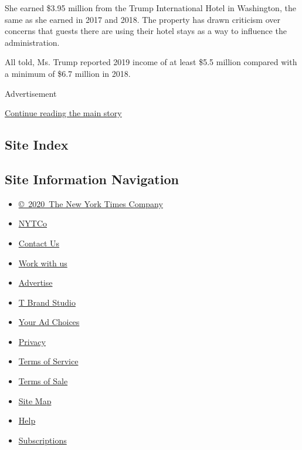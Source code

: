 She earned \$3.95 million from the Trump International Hotel in
Washington, the same as she earned in 2017 and 2018. The property has
drawn criticism over concerns that guests there are using their hotel
stays as a way to influence the administration.

All told, Ms. Trump reported 2019 income of at least \$5.5 million
compared with a minimum of \$6.7 million in 2018.

Advertisement

\protect\hyperlink{after-bottom}{Continue reading the main story}

\hypertarget{site-index}{%
\subsection{Site Index}\label{site-index}}

\hypertarget{site-information-navigation}{%
\subsection{Site Information
Navigation}\label{site-information-navigation}}

\begin{itemize}
\tightlist
\item
  \href{https://help.nytimes3xbfgragh.onion/hc/en-us/articles/115014792127-Copyright-notice}{©~2020~The
  New York Times Company}
\end{itemize}

\begin{itemize}
\tightlist
\item
  \href{https://www.nytco.com/}{NYTCo}
\item
  \href{https://help.nytimes3xbfgragh.onion/hc/en-us/articles/115015385887-Contact-Us}{Contact
  Us}
\item
  \href{https://www.nytco.com/careers/}{Work with us}
\item
  \href{https://nytmediakit.com/}{Advertise}
\item
  \href{http://www.tbrandstudio.com/}{T Brand Studio}
\item
  \href{https://www.nytimes3xbfgragh.onion/privacy/cookie-policy\#how-do-i-manage-trackers}{Your
  Ad Choices}
\item
  \href{https://www.nytimes3xbfgragh.onion/privacy}{Privacy}
\item
  \href{https://help.nytimes3xbfgragh.onion/hc/en-us/articles/115014893428-Terms-of-service}{Terms
  of Service}
\item
  \href{https://help.nytimes3xbfgragh.onion/hc/en-us/articles/115014893968-Terms-of-sale}{Terms
  of Sale}
\item
  \href{https://spiderbites.nytimes3xbfgragh.onion}{Site Map}
\item
  \href{https://help.nytimes3xbfgragh.onion/hc/en-us}{Help}
\item
  \href{https://www.nytimes3xbfgragh.onion/subscription?campaignId=37WXW}{Subscriptions}
\end{itemize}
